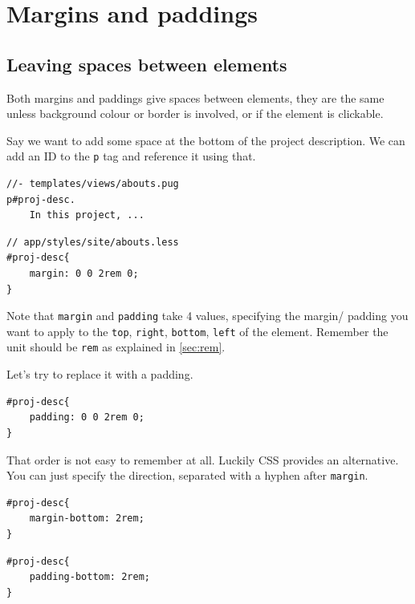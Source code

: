 \section{Margins and paddings}
\label{sec:marginpadding}
\label{sec:margin}

\subsection*{Leaving spaces between elements}

Both margins and paddings give spaces between elements, they are the same unless background colour or border is involved, or if the element is clickable.

Say we want to add some space at the bottom of the project description. We can add an ID to the \texttt{p} tag and reference it using that.

\begin{lstlisting}[language=pug]
//- templates/views/abouts.pug
p#proj-desc.
    In this project, ...
\end{lstlisting}

\begin{lstlisting}[language=pug]
// app/styles/site/abouts.less
#proj-desc{
    margin: 0 0 2rem 0;
}
\end{lstlisting}

Note that \texttt{margin} and \texttt{padding} take 4 values, specifying the margin/ padding you want to apply to the \texttt{top}, \texttt{right}, \texttt{bottom}, \texttt{left} of the element. Remember the unit should be \texttt{rem} as explained in \cref{sec:rem}.

Let's try to replace it with a padding.

\begin{lstlisting}[language=pug]
#proj-desc{
    padding: 0 0 2rem 0;
}
\end{lstlisting}

That order is not easy to remember at all. Luckily CSS provides an alternative. You can just specify the direction, separated with a hyphen after \texttt{margin}.

\begin{lstlisting}[language=pug]
#proj-desc{
    margin-bottom: 2rem;
}
\end{lstlisting}

\begin{lstlisting}[language=pug]
#proj-desc{
    padding-bottom: 2rem;
}
\end{lstlisting}

